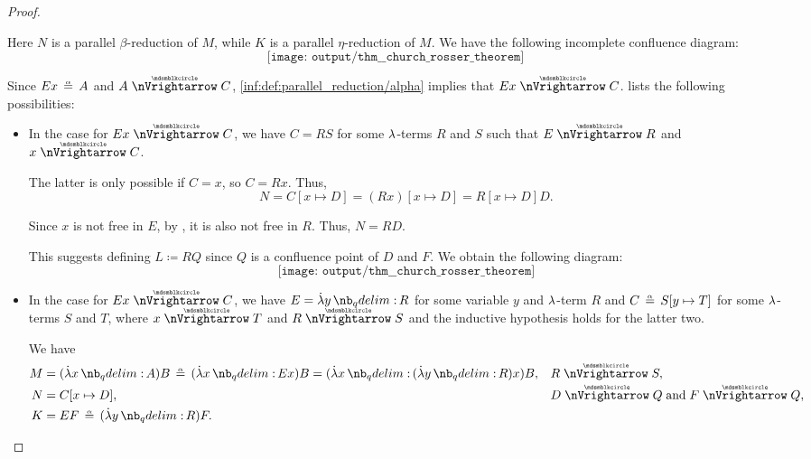 \begin{proof}
\begin{itemize}
\begin{itemize}
\begin{itemize}
        Here \( N \) is a parallel \( \beta \)-reduction of \( M \), while \( K \) is a parallel \( \eta \)-reduction of \( M \). We have the following incomplete confluence diagram:
        \begin{equation*}
          \texttt{[image: output/thm\_\_church\_rosser\_theorem]}
        \end{equation*}

        Since \( Ex \aequiv A \) and \( A \ppred C \), \ref{inf:def:parallel_reduction/alpha} implies that \( Ex \ppred C \).  lists the following possibilities:
        \begin{itemize}
          \item In the case  for \( Ex \ppred C \), we have \( C = RS \) for some \( {\mathrm \lambda} \)-terms \( R \) and \( S \) such that \( E \ppred R \) and \( x \ppred C \).

          The latter is only possible if \( C = x \), so \( C = Rx \). Thus,
          \begin{equation*}
            N = C[x \mapsto D] = (Rx)[x \mapsto D] = R[x \mapsto D] D.
          \end{equation*}

          Since \( x \) is not free in \( E \), by , it is also not free in \( R \). Thus, \( N = RD \).

          This suggests defining \( L \coloneqq RQ \) since \( Q \) is a confluence point of \( D \) and \( F \). We obtain the following diagram:
          \begin{equation*}
            \texttt{[image: output/thm\_\_church\_rosser\_theorem]}
          \end{equation*}

          \item In the case  for \( Ex \ppred C \), we have \( E = \qabs y R \) for some variable \( y \) and \( {\mathrm \lambda} \)-term \( R \) and \( C \aequiv S[y \mapsto T] \) for some \( {\mathrm \lambda} \)-terms \( S \) and \( T \), where \( x \ppred T \) and \( R \ppred S \) and the inductive hypothesis holds for the latter two.

          We have
          \begin{align*}
            M &= (\qabs x A) B \aequiv (\qabs x E x) B = (\qabs x (\qabs y R) x) B, &&R \ppred S, \\
            N &= C[x \mapsto D],                                                    &&D \ppred Q \T{and} F \ppred Q, \\
            K &= EF \aequiv (\qabs y R) F.                                          &&
          \end{align*}


\end{itemize}
\end{itemize}
\end{itemize}
\end{itemize}
\end{proof}
